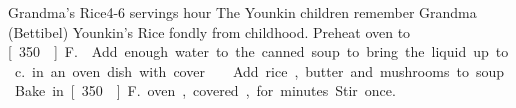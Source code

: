 \begin{recipe}{Grandma's Rice}{4-6 servings}{ hour}
\freeform The Younkin children remember Grandma (Bettibel) Younkin's Rice fondly from childhood.
\newstep Preheat oven to \unit[350\0]{F.} 
Add enough water to the canned soup to bring the liquid up to \unit[2]{c.} in an oven dish with cover.
Add rice, butter and mushrooms to soup.
\newstep Bake in \unit[350\0]{F.} oven, covered, for \unit[30--45]{minutes}.  Stir once.
\end{recipe}
